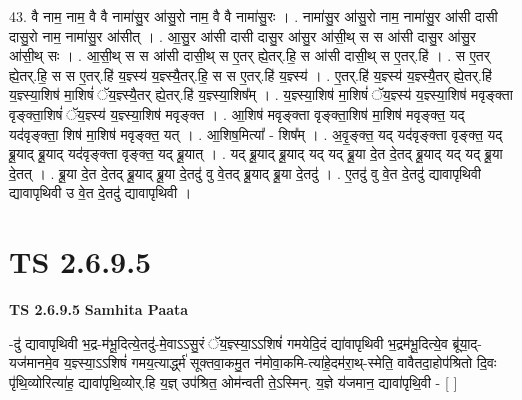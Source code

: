 \documentclass[17pt]{extarticle}
\begin{document}
43. वै नाम॒ नाम॒ वै वै नामा॑सु॒र आ॑सु॒रो नाम॒ वै वै नामा॑सु॒रः । . नामा॑सु॒र आ॑सु॒रो नाम॒ नामा॑सु॒र आ॑सी दासी दासु॒रो नाम॒ नामा॑सु॒र आ॑सीत् । . आ॒सु॒र आ॑सी दासी दासु॒र आ॑सु॒र आ॑सी॒थ् स स आ॑सी दासु॒र आ॑सु॒र आ॑सी॒थ् सः । . आ॒सी॒थ् स स आ॑सी दासी॒थ् स ए॒तर् ह्ये॒तर्.हि॒ स आ॑सी दासी॒थ् स ए॒तर्.हि॑ । . स ए॒तर् ह्ये॒तर्.हि॒ स स ए॒तर्.हि॑ य॒ज्ञ्स्य॑ य॒ज्ञ्स्यै॒तर्.हि॒ स स ए॒तर्.हि॑ य॒ज्ञ्स्य॑ । . ए॒तर्.हि॑ य॒ज्ञ्स्य॑ य॒ज्ञ्स्यै॒तर् ह्ये॒तर्.हि॑ य॒ज्ञ्स्या॒शिष॑ मा॒शिषं॑ ॅय॒ज्ञ्स्यै॒तर् ह्ये॒तर्.हि॑ य॒ज्ञ्स्या॒शिष᳚म् । . य॒ज्ञ्स्या॒शिष॑ मा॒शिषं॑ ॅय॒ज्ञ्स्य॑ य॒ज्ञ्स्या॒शिष॑ मवृङ्क्ता वृङ्क्ता॒शिषं॑ ॅय॒ज्ञ्स्य॑ य॒ज्ञ्स्या॒शिष॑ मवृङ्क्त । . आ॒शिष॑ मवृङ्क्ता वृङ्क्ता॒शिष॑ मा॒शिष॑ मवृङ्क्त॒ यद् यद॑वृङ्क्ता॒ शिष॑ मा॒शिष॑ मवृङ्क्त॒ यत् । . आ॒शिष॒मित्या᳚ - शिष᳚म् । . अ॒वृ॒ङ्क्त॒ यद् यद॑वृङ्क्ता वृङ्क्त॒ यद् ब्रू॒याद् ब्रू॒याद् यद॑वृङ्क्ता वृङ्क्त॒ यद् ब्रू॒यात् । . यद् ब्रू॒याद् ब्रू॒याद् यद् यद् ब्रू॒या दे॒त दे॒तद् ब्रू॒याद् यद् यद् ब्रू॒या दे॒तत् । . ब्रू॒या दे॒त दे॒तद् ब्रू॒याद् ब्रू॒या दे॒तदु॑ वु वे॒तद् ब्रू॒याद् ब्रू॒या दे॒तदु॑ । . ए॒तदु॑ वु वे॒त दे॒तदु॑ द्यावापृथिवी द्यावापृथिवी उ वे॒त दे॒तदु॑ द्यावापृथिवी । \newline
\pagebreak
{}

\section{ TS 2.6.9.5 }

\textbf{TS 2.6.9.5 } \newline
\textbf{Samhita Paata} \newline

-दु॑ द्यावापृथिवी भ॒द्र-म॑भू॒दित्ये॒तदु॑-मे॒वाऽऽसु॒रं ॅय॒ज्ञ्स्या॒ऽऽशिषं॑ गमयेदि॒दं द्या॑वापृथिवी भ॒द्रम॑भू॒दित्ये॒व ब्रू॑या॒द्-यज॑मानमे॒व य॒ज्ञ्स्या॒ऽऽशिषं॑ गमय॒त्यार्द्ध्म॑ सूक्तवा॒कमु॒त न॑मोवा॒कमि-त्या॑हे॒दम॑रा॒थ्-स्मेति॒ वावैतदा॒होप॑श्रितो दि॒वः पृ॑थि॒व्योरित्या॑ह॒ द्यावा॑पृथि॒व्योर्.हि य॒ज्ञ् उप॑श्रित॒ ओम॑न्वती ते॒ऽस्मिन्. य॒ज्ञे य॑जमान॒ द्यावा॑पृथि॒वी - [  ] \newline
\end{document}
